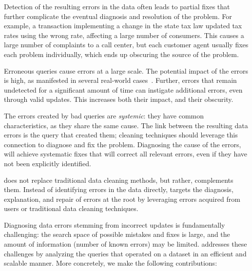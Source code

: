 \begin{description}[leftmargin=*, topsep=0mm, itemsep=0mm]
    
    \item[Obscurity.] Detection of the resulting errors in the data often
    leads to partial fixes that further complicate the eventual diagnosis and
    resolution of the problem. For example, a transaction implementing a
    change in the state tax law updated tax rates using the wrong rate,
    affecting a large number of consumers. This causes a large number of
    complaints to a call center, but each customer agent usually fixes each
    problem individually, which ends up obscuring the source of the problem.
    
    \item[Large impact.] Erroneous queries cause errors at a large scale. The
    potential impact of the errors is high, as manifested in several
    real-world cases~\cite{Yates10, Grady13, sakalerrors}. Further, errors
    that remain undetected for a significant amount of time can instigate
    additional errors, even through valid updates. This increases both their
    impact, and their obscurity.
    
    \item[Systemic errors.] The errors created by bad queries are
    \emph{systemic}: they have common characteristics, as they share the same
    cause. The link between the resulting data errors is the query that
    created them; cleaning techniques should leverage this connection to
    diagnose and fix the problem. Diagnosing the cause of the errors, will
    achieve systematic fixes that will correct all relevant errors, even if
    they have not been explicitly identified.
    
\end{description}
% 
\sys does not replace traditional data cleaning methods, but rather, complements them.
Instead of identifying errors in the data directly, 
\sys targets the diagnosis, explanation, and repair of errors at the root by
leveraging errors acquired from 
users or traditional data cleaning techniques.

Diagnosing data errors stemming from incorrect updates is fundamentally
challenging: the search space of possible mistakes and fixes is large, and the
amount of information (number of known errors) may be limited. 
\sys addresses these challenges by analyzing the queries that operated on a
dataset in an efficient and scalable manner. More concretely, we make the
following contributions:



